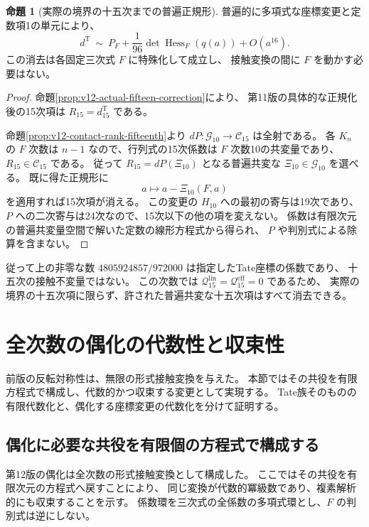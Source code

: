 \documentclass[a4paper,11pt]{ltjsarticle}
\theoremstyle{definition}
\newtheorem{theorem}{命題}[section]
\begin{document}
\begin{theorem}[実際の境界の十五次までの普遍正規形]
\label{thm:v12-fifteenth-normal-form}
普遍的に多項式な座標変更と定数項1の単元により、
\[
 \boxed{\displaystyle
 d^{\mathrm T}\ \sim\
 P_F+\frac1{96}\det\operatorname{Hess}_F(q(a))+O(a^{16}).}
\]
この消去は各固定三次式 $F$ に特殊化して成立し、
接触変換の間に $F$ を動かす必要はない。
\end{theorem}

\begin{proof}
命題\ref{prop:v12-actual-fifteen-correction}により、
第11版の具体的な正規化後の15次項は $R_{15}=d^{\mathrm T}_{15}$ である。

命題\ref{prop:v12-contact-rank-fifteenth}より
$dP:\mathcal G_{10}\to\mathcal C_{15}$ は全射である。
各 $K_n$ の $F$ 次数は $n-1$ なので、行列式の15次係数は
$F$ 次数10の共変量であり、$R_{15}\in\mathcal C_{15}$ である。
従って $R_{15}=dP(\Xi_{10})$ となる普遍共変な
$\Xi_{10}\in\mathcal G_{10}$ を選べる。
既に得た正規形に
\[
 a\longmapsto a-\Xi_{10}(F,a)
\]
を適用すれば15次項が消える。
この変更の $H_{10}$ への最初の寄与は19次であり、
$P$ への二次寄与は24次なので、15次以下の他の項を変えない。
係数は有限次元の普遍共変量空間で解いた定数の線形方程式から得られ、
$P$ や判別式による除算を含まない。
\end{proof}

従って上の非零な数
$4805924857/972000$ は指定したTate座標の係数であり、
十五次の接触不変量ではない。
この次数では $\mathcal Q^{\mathrm{lin}}_{15}
=\mathcal Q^{\mathrm{eff}}_{15}=0$ であるため、
実際の境界の十五次項に限らず、許された普遍共変な十五次項はすべて消去できる。


\clearpage
\section{全次数の偶化の代数性と収束性}
\label{sec:algebraic-parity}

前版の反転対称性は、無限の形式接触変換を与えた。
本節ではその共役を有限方程式で構成し、代数的かつ収束する変更として実現する。
Tate族そのものの有限代数化と、偶化する座標変更の代数化を分けて証明する。


\subsection{偶化に必要な共役を有限個の方程式で構成する}
\label{subsec:v13-algebraic-parity}

第12版の偶化は全次数の形式接触変換として構成した。
ここではその共役を有限次元の方程式へ戻すことにより、
同じ変換が代数的冪級数であり、複素解析的にも収束することを示す。
係数環を三次式の全係数の多項式環とし、$F$ の判別式は逆にしない。
\end{document}
